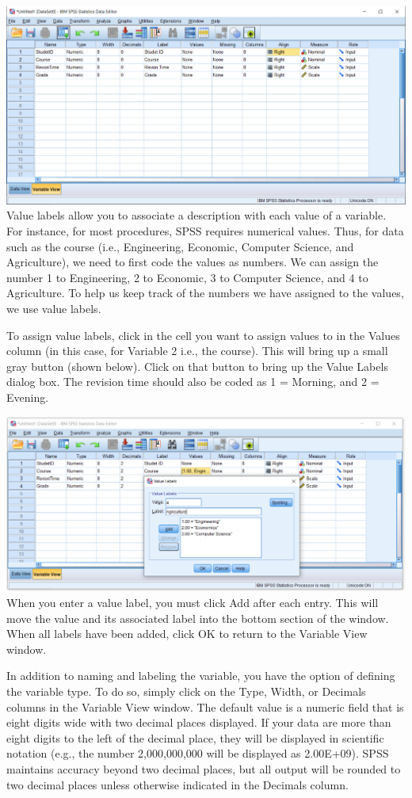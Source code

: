 \documentclass[
]{book}
\begin{document}
\includegraphics{variableview.png}
Value labels allow you to associate a description with each value of a variable. For instance, for most procedures, SPSS requires numerical values. Thus, for data such as the course (i.e., Engineering, Economic, Computer Science, and Agriculture), we need to first code the values as numbers. We can assign the number 1 to Engineering, 2 to Economic, 3 to Computer Science, and 4 to Agriculture. To help us keep track of the numbers we have assigned to the values, we use value labels.

To assign value labels, click in the cell you want to assign values to in the Values column (in this case, for Variable 2 i.e., the course). This will bring up a small gray button (shown below). Click on that button to bring up the Value Labels dialog box. The revision time should also be coded as 1 = Morning, and 2 = Evening.

\includegraphics{valuelabel.png}
When you enter a value label, you must click Add after each entry. This will move the value and its associated label into the bottom section of the window. When all labels have been added, click OK to return to the Variable View window.

In addition to naming and labeling the variable, you have the option of defining the variable type. To do so, simply click on the Type, Width, or Decimals columns in the Variable View window. The default value is a numeric field that is eight digits wide with two decimal places displayed. If your data are more than eight digits to the left of the decimal place, they will be displayed in scientific notation (e.g., the number 2,000,000,000 will be displayed as 2.00E+09). SPSS maintains accuracy beyond two decimal places, but all output will be rounded to two decimal places unless otherwise indicated in the Decimals column.
\end{document}
